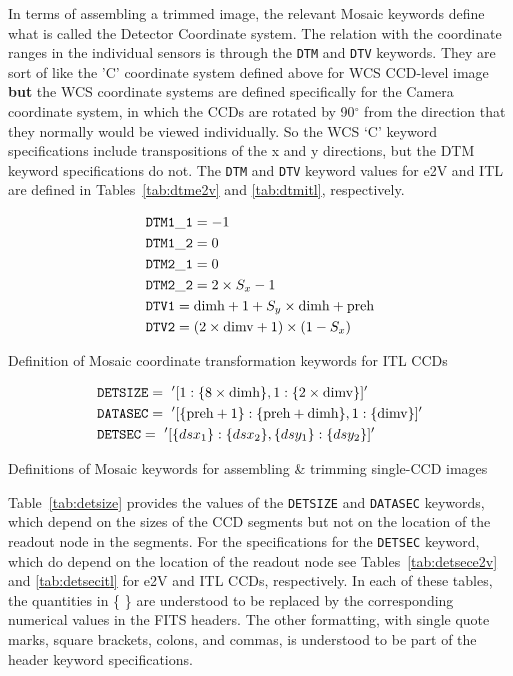 \documentclass{article}[12pt]
\begin{document}
{In terms of assembling a trimmed image, the relevant Mosaic keywords define what is called the Detector Coordinate system.  The relation with the coordinate ranges in the individual sensors is through the {\tt DTM} and {\tt DTV} keywords.  
They are sort of like the 'C' coordinate system defined above for WCS CCD-level image {\bf but} the WCS coordinate systems are defined specifically for the Camera coordinate system, in which the CCDs are rotated by 90$^\circ$ from the direction that they normally would be viewed individually.  So the WCS `C' keyword specifications include transpositions of the x and y directions, but the DTM keyword specifications do not.  The {\tt DTM} and {\tt DTV} keyword values for e2V and ITL are defined in Tables~\ref{tab:dtme2v} and \ref{tab:dtmitl}, respectively.



\begin{table}
\begin{align*}
& {\tt DTM1\_1} = -1 \\
& {\tt DTM1\_2} = 0 \\
& {\tt DTM2\_1} = 0 \\
& {\tt DTM2\_2} = 2 \times S_x - 1 \\
& {\tt DTV1} = {\rm dimh} + 1 + S_y \times {\rm dimh} + {\rm preh}  \\
& {\tt DTV2} = (2 \times {\rm dimv} + 1) \times (1 - S_x) \\
\end{align*}
\caption{Definition of Mosaic coordinate transformation keywords for ITL CCDs\label{tab:dtmitl}}
\end{table}


\begin{table}
\begin{align*}
& {\tt DETSIZE} =~'[1: \{8 \times {\rm dimh}\}, 1: \{2 \times {\rm dimv}\}]' \\
& {\tt DATASEC} =~'[ \{{\rm preh} + 1\} : \{{\rm preh} + {\rm dimh}\}, 1 :  \{{\rm dimv}\}]' \\
& {\tt DETSEC} =~'[ \{dsx_1\} : \{dsx_2\}, \{dsy_1\}: \{dsy_2\}]' \\
\end{align*}
\caption{Definitions of Mosaic keywords for assembling \& trimming single-CCD images\label{tab:detsize}}
\end{table}

Table~\ref{tab:detsize} provides the values of the {\tt DETSIZE} and {\tt DATASEC} keywords, which depend on the sizes of the CCD segments but not on the location of the readout node in the segments.  For the specifications for the {\tt DETSEC} keyword, which do depend on the location of the readout node see Tables~\ref{tab:detsece2v} and \ref{tab:detsecitl} for e2V and ITL CCDs, respectively.  In each of these tables, the quantities in \{ \} are understood to be replaced by the corresponding numerical values in the FITS headers.  The other formatting, with single quote marks, square brackets, colons, and commas, is understood to be part of the header keyword specifications.

}
\end{document}
